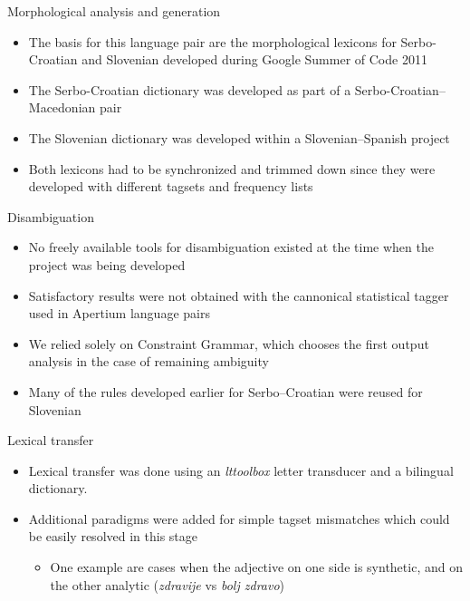 \documentclass{beamer}
\begin{document}
\begin{frame}{Morphological analysis and generation}
\begin{itemize}

\item The basis for this language pair are the morphological lexicons for Serbo-Croatian and Slovenian developed during Google Summer of Code 2011
\item The Serbo-Croatian dictionary was developed as part of a Serbo-Croatian--Macedonian pair
\item The Slovenian dictionary was developed within a Slovenian--Spanish project
\item Both lexicons had to be synchronized and trimmed down since they were developed with different tagsets and frequency lists 

\end{itemize}
\end{frame}

\begin{frame}{Disambiguation}
\begin{itemize}

\item No freely available tools for disambiguation existed at the time when the project was being developed
\item Satisfactory results were not obtained with the cannonical statistical tagger used in Apertium language pairs
\item We relied solely on Constraint Grammar, which chooses the first output analysis in the case of remaining ambiguity
\item Many of the rules developed earlier for Serbo--Croatian were reused for Slovenian

\end{itemize}
\end{frame}

\begin{frame}{Lexical transfer}
\begin{itemize}

\item Lexical transfer was done using an \emph{lttoolbox} letter transducer and a bilingual dictionary.
\item Additional paradigms were added for simple tagset mismatches which could be easily resolved in this stage
\begin{itemize}
	\item One example are cases when the adjective on one side is synthetic, and on the other analytic (\emph{zdravije} vs \emph{bolj zdravo})
\end{itemize}
\end{itemize}
\end{frame}
\end{document}
